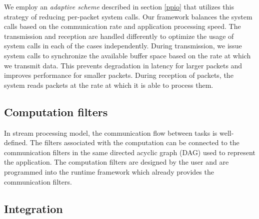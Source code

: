 \documentclass[10pt, conference, compsocconf, reqno]{IEEEtran}
\newcommand{\comment}[1]{}
\begin{document}
We employ an \textit{adaptive scheme} described in section \ref{ppio} that utilizes this strategy of reducing per-packet system calls. Our framework balances the system calls based on the communication rate and application processing speed. The transmission and reception are handled differently to optimize the usage of system calls in each of the cases independently. During transmission, we issue system calls to synchronize the available buffer space based on the rate at which we transmit data. This prevents degradation in latency for larger packets and improves performance for smaller packets. During reception of packets, the system reads packets at the rate at which it is able to process them.

\subsection{Computation filters}

\comment{Computation filters represents the operations associated . The subset of the application that we are interested in parallelizing is the stream processing component.} In stream processing model, the communication flow between tasks is well-defined. \comment{This is usually represented by a synchronous data flow graph (SDF).} The filters associated with the computation can be connected to the communication filters in the same directed acyclic graph (DAG) used to represent the application. \comment{The packet processing tasks operate on packets and the application tasks operate on the data. Since we focus more on parallel packet processing, optimizations in relation to the application graph are not discussed. It is assumed that a static version of the application graph is available and we focus more on executing these tasks in parallel with the packet processing tasks.} The computation filters are designed by the user and are programmed into the runtime framework which already provides the communication filters.

\subsection{Integration}

\comment{The sequence of tasks that can be executed in parallel is determined at this stage. The integration stage is used to combine the application graph and the packet processing graph into a larger graph that unifies and represents the overall operations. The dependency relations identified earlier are used in establishing links between the graphs. We determine the sequence of tasks that can be executed in parallel from both the application task graph and packet processing graph. The combined set of tasks is then used by the parallel processing engine.}
\end{document}
